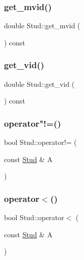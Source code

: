 \mbox{\label{class_stud_af2dca7dde881ef1d7faa4fc25bd6fb8c}} 
\subsubsection{\texorpdfstring{get\_mvid()}{get\_mvid()}}
{\footnotesize\ttfamily double Stud\+::get\+\_\+mvid (\begin{DoxyParamCaption}{ }\end{DoxyParamCaption}) const\hspace{0.3cm}{\ttfamily [inline]}}

\mbox{\label{class_stud_aa43897451b4f38e742d515fabb662f81}} 
\subsubsection{\texorpdfstring{get\_vid()}{get\_vid()}}
{\footnotesize\ttfamily double Stud\+::get\+\_\+vid (\begin{DoxyParamCaption}{ }\end{DoxyParamCaption}) const\hspace{0.3cm}{\ttfamily [inline]}}

\mbox{\label{class_stud_a6b08af30aac6482b43624c17da099e2f}} 
\subsubsection{\texorpdfstring{operator"!=()}{operator!=()}}
{\footnotesize\ttfamily bool Stud\+::operator!= (\begin{DoxyParamCaption}\item[{const \mbox{\hyperlink{class_stud}{Stud}} \&}]{A }\end{DoxyParamCaption})}

\mbox{\label{class_stud_aeb5b71435c3d09d857894b3d6048c013}} 
\subsubsection{\texorpdfstring{operator$<$()}{operator<()}}
{\footnotesize\ttfamily bool Stud\+::operator$<$ (\begin{DoxyParamCaption}\item[{const \mbox{\hyperlink{class_stud}{Stud}} \&}]{A }\end{DoxyParamCaption})}

